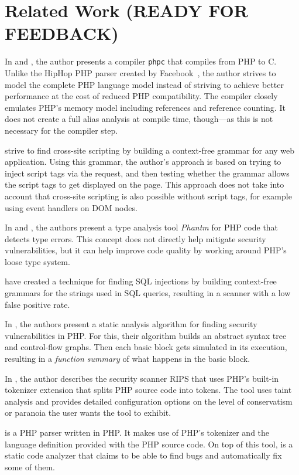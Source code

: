 \chapter{Related Work (READY FOR FEEDBACK)}
\label{related-work}

In \cite{phpc-thesis} and \cite{phpc-paper}, the author presents a compiler \texttt{phpc} that compiles from PHP to C. Unlike the HipHop PHP parser created by Facebook~\cite{hiphop}, the author strives to model the complete PHP language model instead of striving to achieve better performance at the cost of reduced PHP compatibility. The compiler closely emulates PHP's memory model including references and reference counting. It does not create a full alias analysis at compile time, though---as this is not necessary for the compiler step.

\cite{xss-via-grammar} strive to find cross-site scripting by building a context-free grammar for any web application. Using this grammar, the author's approach is based on trying to inject script tags via the request, and then testing whether the grammar allows the script tags to get displayed on the page. This approach does not take into account that cross-site scripting is also possible without script tags, for example using event handlers on DOM nodes.

In \cite{phantom-1} and \cite{phantom-2}, the authors present a type analysis tool \emph{Phantm} for PHP code that detects type errors. This concept does not directly help mitigate security vulnerabilities, but it can help improve code quality by working around PHP's loose type system.

\cite{wassermann-sound} have created a technique for finding SQL injections by building context-free grammars for the strings used in SQL queries, resulting in a scanner with a low false positive rate.

In \cite{static-php}, the authors present a static analysis algorithm for finding security vulnerabilities in PHP. For this, their algorithm builds an abstract syntax tree and control-flow graphs. Then each basic block gets simulated in its execution, resulting in a \emph{function summary} of what happens in the basic block.

In \cite{rips}, the author describes the security scanner RIPS that uses PHP's built-in tokenizer extension that splits PHP source code into tokens. The tool uses taint analysis and provides detailed configuration options on the level of conservatism or paranoia the user wants the tool to exhibit.

\cite{php-parser-popov} is a PHP parser written in PHP. It makes use of PHP's tokenizer and the language definition provided with the PHP source code. On top of this tool, \cite{php-analyzer} is a static code analyzer that claims to be able to find bugs and automatically fix some of them.
